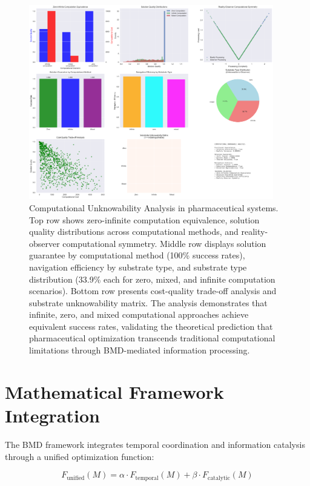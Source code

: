 \documentclass[12pt,a4paper]{article}
\begin{document}
\begin{figure}[htbp]
    \centering
    \includegraphics[width=0.95\textwidth]{images/computational_unknowable_analysis_20250925_192139.png}
    \caption{Computational Unknowability Analysis in pharmaceutical systems. Top row shows zero-infinite computation equivalence, solution quality distributions across computational methods, and reality-observer computational symmetry. Middle row displays solution guarantee by computational method (100\% success rates), navigation efficiency by substrate type, and substrate type distribution (33.9\% each for zero, mixed, and infinite computation scenarios). Bottom row presents cost-quality trade-off analysis and substrate unknowability matrix. The analysis demonstrates that infinite, zero, and mixed computational approaches achieve equivalent success rates, validating the theoretical prediction that pharmaceutical optimization transcends traditional computational limitations through BMD-mediated information processing.}
    \label{fig:computational_unknowable}
    \end{figure}

\section{Mathematical Framework Integration}

The BMD framework integrates temporal coordination and information catalysis through a unified optimization function:

\begin{equation}
F_{\text{unified}}(M) = \alpha \cdot F_{\text{temporal}}(M) + \beta \cdot F_{\text{catalytic}}(M)
\end{equation}
\end{document}
